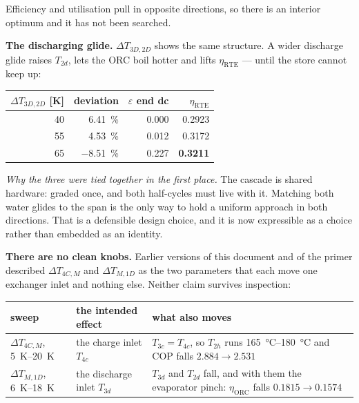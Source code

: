 \noindent
Efficiency and utilisation pull in opposite directions, so there is an interior
optimum and it has not been searched.

\medskip
\noindent\textbf{The discharging glide.} $\Delta T_{3D,2D}$ shows the same
structure. A wider discharge glide raises $T_{2d}$, lets the ORC boil hotter
and lifts $\eta_{\mathrm{RTE}}$ --- until the store cannot keep up:

\begin{center}
\begin{tabular}{@{}r r r r@{}}
\toprule
$\Delta T_{3D,2D}$ [\si{\kelvin}] & deviation & $\varepsilon$ end dc
 & $\eta_{\mathrm{RTE}}$ \\
\midrule
40 & \SI{+6.41}{\percent} & 0.000 & 0.2923 \\
55 & \SI{+4.53}{\percent} & 0.012 & 0.3172 \\
65 & \SI{-8.51}{\percent} & 0.227 & \textbf{0.3211} \\
\bottomrule
\end{tabular}
\end{center}

\noindent
\emph{Why the three were tied together in the first place.} The cascade is
shared hardware: graded once, and both half-cycles must live with it. Matching
both water glides to the span is the only way to hold a uniform approach in
both directions. That is a defensible design choice, and it is now expressible
as a choice rather than embedded as an identity.

\medskip
\noindent\textbf{There are no clean knobs.} Earlier versions of this document
and of the primer described $\Delta T_{4C,M}$ and $\Delta T_{M,1D}$ as the two
parameters that each move one exchanger inlet and nothing else. Neither claim
survives inspection:

\begin{center}
\begin{tabular}{@{}l l l@{}}
\toprule
sweep & the intended effect & what also moves \\
\midrule
$\Delta T_{4C,M}$, \SIrange{5}{20}{\kelvin} & the charge inlet $T_{4c}$
  & $T_{3c}=T_{4c}$, so $T_{2h}$ runs \SIrange{165}{180}{\celsius}
    and $\mathrm{COP}$ falls $2.884\to2.531$ \\
$\Delta T_{M,1D}$, \SIrange{6}{18}{\kelvin} & the discharge inlet $T_{3d}$
  & $T_{3d}$ and $T_{2d}$ fall, and with them the evaporator pinch:
    $\eta_{\mathrm{ORC}}$ falls $0.1815\to0.1574$ \\
\bottomrule
\end{tabular}
\end{center}

